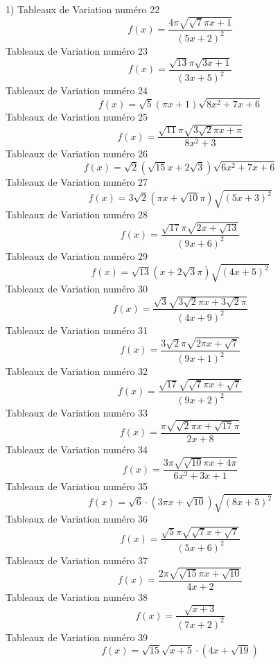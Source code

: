 \documentclass{article}
\begin{document}
1\right) \]Tableaux de Variation num\'ero 22 \[f(x) = \frac{4 \pi \sqrt{\sqrt{7} \pi x + 1}}{\left(5 x + 2\right)^{2}}\]Tableaux de Variation num\'ero 23 \[f(x) = \frac{\sqrt{13} \pi \sqrt{3 x + 1}}{\left(3 x + 5\right)^{2}}\]Tableaux de Variation num\'ero 24 \[f(x) = \sqrt{5} \left(\pi x + 1\right) \sqrt{8 x^{2} + 7 x + 6}\]Tableaux de Variation num\'ero 25 \[f(x) = \frac{\sqrt{11} \pi \sqrt{3 \sqrt{2} \pi x + \pi}}{8 x^{2} + 3}\]Tableaux de Variation num\'ero 26 \[f(x) = \sqrt{2} \left(\sqrt{15} x + 2 \sqrt{3}\right) \sqrt{6 x^{2} + 7 x + 6}\]Tableaux de Variation num\'ero 27 \[f(x) = 3 \sqrt{2} \left(\pi x + \sqrt{10} \pi\right) \sqrt{\left(5 x + 3\right)^{2}}\]Tableaux de Variation num\'ero 28 \[f(x) = \frac{\sqrt{17} \pi \sqrt{2 x + \sqrt{13}}}{\left(9 x + 6\right)^{2}}\]Tableaux de Variation num\'ero 29 \[f(x) = \sqrt{13} \left(x + 2 \sqrt{3} \pi\right) \sqrt{\left(4 x + 5\right)^{2}}\]Tableaux de Variation num\'ero 30 \[f(x) = \frac{\sqrt{3} \sqrt{3 \sqrt{2} \pi x + 3 \sqrt{2} \pi}}{\left(4 x + 9\right)^{2}}\]Tableaux de Variation num\'ero 31 \[f(x) = \frac{3 \sqrt{2} \pi \sqrt{2 \pi x + \sqrt{7}}}{\left(9 x + 1\right)^{2}}\]Tableaux de Variation num\'ero 32 \[f(x) = \frac{\sqrt{17} \sqrt{\sqrt{7} \pi x + \sqrt{7}}}{\left(9 x + 2\right)^{2}}\]Tableaux de Variation num\'ero 33 \[f(x) = \frac{\pi \sqrt{\sqrt{2} \pi x + \sqrt{17} \pi}}{2 x + 8}\]Tableaux de Variation num\'ero 34 \[f(x) = \frac{3 \pi \sqrt{\sqrt{10} \pi x + 4 \pi}}{6 x^{2} + 3 x + 1}\]Tableaux de Variation num\'ero 35 \[f(x) = \sqrt{6} \cdot \left(3 \pi x + \sqrt{10}\right) \sqrt{\left(8 x + 5\right)^{2}}\]Tableaux de Variation num\'ero 36 \[f(x) = \frac{\sqrt{5} \pi \sqrt{\sqrt{7} x + \sqrt{7}}}{\left(5 x + 6\right)^{2}}\]Tableaux de Variation num\'ero 37 \[f(x) = \frac{2 \pi \sqrt{\sqrt{15} \pi x + \sqrt{10}}}{4 x + 2}\]Tableaux de Variation num\'ero 38 \[f(x) = \frac{\sqrt{x + 3}}{\left(7 x + 2\right)^{2}}\]Tableaux de Variation num\'ero 39 \[f(x) = \sqrt{15} \sqrt{x + 5} \cdot \left(4 x + \sqrt{19}\right)\]
\end{document}

